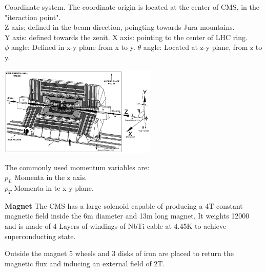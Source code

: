 \documentclass[8pt]{beamer}
\begin{document}
\begin{frame}[fragile]{Coordinate system.}
	The coordinate origin is located at the center of CMS, in the "iteraction point".
	\\
	Z axis: defined in the beam direction, poingting towards Jura mountains.
	\\
	Y axis: defined towards the zenit.
	X axis: pointing to the center of LHC ring.
	\\
	$\phi$ angle: Defined in x-y plane from x to y.
	$\theta$ angle: Located at z-y plane, from z to y.
	\vspace{0.5cm}
	\begin{minipage}{0.6\textwidth}%
		\includegraphics[width=7.5cm]{10}
	\end{minipage}
	\hfill
	\begin{minipage}{0.3\textwidth}\raggedleft
		The commonly used momentum variables are:
		\\
		\textbf{$p_L$} Momenta in the z axis.
		\\
		\textbf{$p_T$} Momenta in te x-y plane.
	\end{minipage}
	\textbf{Magnet}
	The CMS has a large solenoid capable of producing a 4T constant magnetic field inside the 6m diameter and 13m long magnet. It weights 12000 and is made of 4 Layers of windings of NbTi cable at 4.45K to achieve superconducting state.
	
	Outside the magnet 5 wheels and 3 disks of iron are placed to return the magnetic flux and inducing an external field of 2T.

\end{frame}

\end{document}
